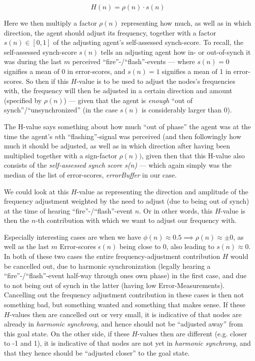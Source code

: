 	\begin{equation}
	\label{h_value}
		H(n) = \rho(n) \cdot s(n)
	\end{equation}
	
	Here we then multiply a factor $\rho(n)$ representing how much, as well as in which direction, the agent should adjust its frequency, together with a factor $s(n) \in [0,1]$ of the adjusting agent's self-assessed synch-score. To recall, the self-assessed synch-score $s(n)$ tells an adjusting agent how in- or out-of-synch it was during the last $m$ perceived ``fire''-/``flash''-events — where $s(n)=0$ signifies a mean of 0 in error-scores, and $s(n)=1$ signifies a mean of 1 in error-scores. So then if this $H$-value is to be used to adjust the nodes's frequencies with, the frequency will then be adjusted in a certain direction and amount (specified by $\rho(n)$) — given that the agent is \textit{enough} ``out of synch''/``unsynchronized'' (in the case $s(n)$ is considerably larger than 0).
	
	The H-value says something about how much ``out of phase'' the agent was at the time the agent's $n$th ``flashing''-signal was perceived (and then followingly how much it should be adjusted, as well as in which direction after having been multiplied together with a sign-factor $\rho(n))$, given then that this H-value also consists of the \textit{self-assessed synch score s(n)} — which again simply was the median of the list of error-scores, \textit{errorBuffer} in our case.
	
	We could look at this $H$-value as representing the direction and amplitude of the frequency adjustment weighted by the need to adjust (due to being out of synch) at the time of hearing ``fire''-/``flash''-event $n$. Or in other words, this $H$-value is then the $n$-th contribution with which we want to adjust our frequency with.
	
	Especially interesting cases are when we have $\phi(n)\approx0.5 \implies \rho(n)\approx\pm0$, as well as the last $m$ Error-scores $\epsilon(n)$ being close to 0, also leading to $s(n)\approx0$. In both of these two cases the entire frequency-adjustment contribution $H$ would be cancelled out, due to harmonic synchronization (legally hearing a ``fire''-/``flash''-event half-way through ones own phase) in the first case, and due to not being out of synch in the latter (having low Error-Measurements). Cancelling out the frequency adjustment contribution in these cases is then not something bad, but something wanted and something that makes sense. If these $H$-values then are cancelled out or very small, it is indicative of that nodes are already in \textit{harmonic synchrony}, and hence should not be ``adjusted away'' from this goal state. On the other side, if these $H$-values then are different (e.g. closer to -1 and 1), it is indicative of that nodes are not yet in \textit{harmonic synchrony}, and that they hence should be ``adjusted closer'' to the goal state.
	
